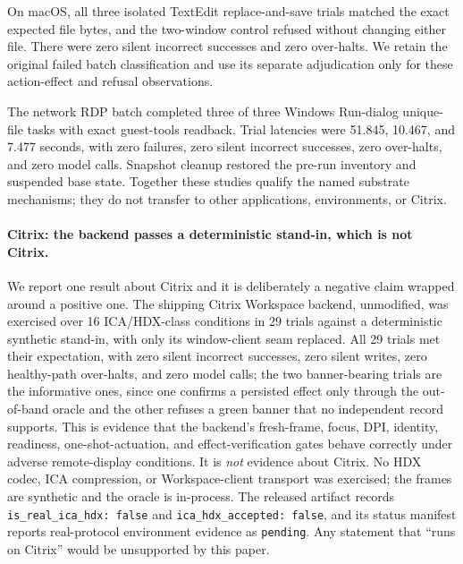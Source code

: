 On macOS, all three isolated TextEdit replace-and-save trials matched the exact
expected file bytes, and the two-window control refused without changing either
file. There were zero silent incorrect successes and zero over-halts. We retain
the original failed batch classification and use its separate adjudication only
for these action-effect and refusal observations.

The network RDP batch completed three of three Windows Run-dialog unique-file
tasks with exact guest-tools readback. Trial latencies were 51.845, 10.467, and
7.477 seconds, with zero failures, zero silent incorrect successes, zero
over-halts, and zero model calls. Snapshot cleanup restored the pre-run inventory
and suspended base state. Together these studies qualify the named substrate
mechanisms; they do not transfer to other applications, environments, or Citrix.

\paragraph{Citrix: the backend passes a deterministic stand-in, which is not
Citrix.} We report one result about Citrix and it is deliberately a negative
claim wrapped around a positive one. The shipping Citrix Workspace backend,
unmodified, was exercised over 16 ICA/HDX-class conditions in 29 trials against
a deterministic synthetic stand-in, with only its window-client seam replaced.
All 29 trials met their expectation, with zero silent incorrect successes, zero
silent writes, zero healthy-path over-halts, and zero model calls; the two
banner-bearing trials are the informative ones, since one confirms a persisted
effect only through the out-of-band oracle and the other refuses a green banner
that no independent record supports. This is evidence that the backend's
fresh-frame, focus, DPI, identity, readiness, one-shot-actuation, and
effect-verification gates behave correctly under adverse remote-display
conditions. It is \emph{not} evidence about Citrix. No HDX codec, ICA
compression, or Workspace-client transport was exercised; the frames are
synthetic and the oracle is in-process. The released artifact records
\texttt{is\_real\_ica\_hdx: false} and \texttt{ica\_hdx\_accepted: false}, and
its status manifest reports real-protocol environment evidence as
\texttt{pending}. Any statement that \system{} ``runs on Citrix'' would be
unsupported by this paper.
